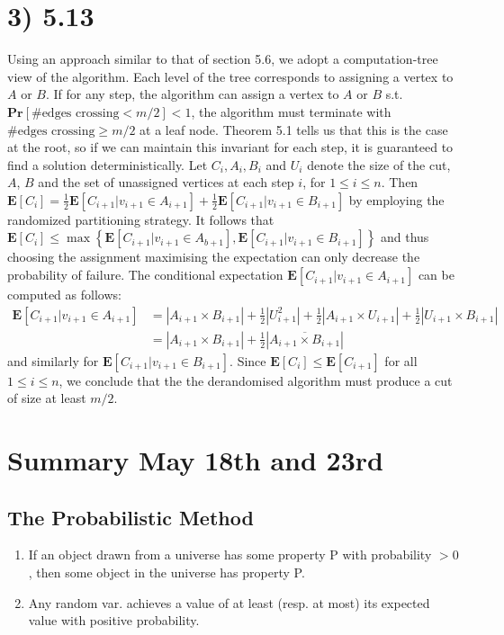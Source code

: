 \documentclass[12pt]{article}
\begin{document}
\section*{3) 5.13}
Using an approach similar to that of section 5.6, we adopt a computation-tree view of the algorithm. Each level of the tree corresponds to assigning a vertex to $A$ or $B$. If for any step, the algorithm can assign a vertex to $A$ or $B$ s.t. $\mathbf{Pr}\left[\text{\# edges crossing} < m/2\right] < 1$, the algorithm must terminate with $\text{\# edges crossing} \geq m/2$ at a leaf node. Theorem 5.1 tells us that this is the case at the root, so if we can maintain this invariant for each step, it is guaranteed to find a solution deterministically. Let $C_i, A_i, B_i$ and $U_i$ denote the size of the cut, $A$, $B$ and the set of unassigned vertices at each step $i$, for $1 \leq i \leq n$. Then $\mathbf{E}\left[ C_i \right] = \frac{1}{2} \mathbf{E} \left[ C_{i+1} | v_{i+1} \in A_{i+1} \right] + \frac{1}{2} \mathbf{E} \left[ C_{i+1} | v_{i+1} \in B_{i+1} \right]$ by employing the randomized partitioning strategy. It follows that $\mathbf{E}\left[ C_i \right] \leq \max \left\{ \mathbf{E} \left[ C_{i+1} | v_{i+1} \in A_{b+1} \right], \mathbf{E} \left[ C_{i+1} | v_{i+1} \in B_{i+1} \right] \right\}$ and thus choosing the assignment maximising the expectation can only decrease the probability of failure. The conditional expectation $\mathbf{E} \left[ C_{i+1} | v_{i+1} \in A_{i+1} \right]$ can be computed as follows:
\begin{align*}
\mathbf{E} \left[ C_{i+1} | v_{i+1} \in A_{i+1} \right] &= \left| A_{i+1} \times B_{i+1} \right| + \frac{1}{2} \left| U_{i+1}^2 \right| + \frac{1}{2} \left| A_{i+1} \times U_{i+1} \right|  + \frac{1}{2} \left| U_{i+1} \times B_{i+1} \right|\\
&= \left| A_{i+1} \times B_{i+1} \right| + \frac{1}{2} |\overline{A_{i+1} \times B_{i+1}}|
\end{align*}
and similarly for $\mathbf{E} \left[ C_{i+1} | v_{i+1} \in B_{i+1} \right]$. Since $\mathbf{E}\left[ C_i \right] \leq \mathbf{E}\left[ C_{i+1} \right]$ for all $1 \leq i \leq n$, we conclude that the the derandomised algorithm must produce a cut of size at least $m/2$.
\pagebreak

\section*{Summary May 18th and 23rd}
\subsection*{The Probabilistic Method}
\begin{enumerate}
\item If an object drawn from a universe has some property P with probability $> 0$, then some object in the universe has property P.
\item Any random var. achieves a value of at least (resp. at most) its expected value with positive probability.
\end{enumerate}
\end{document}
